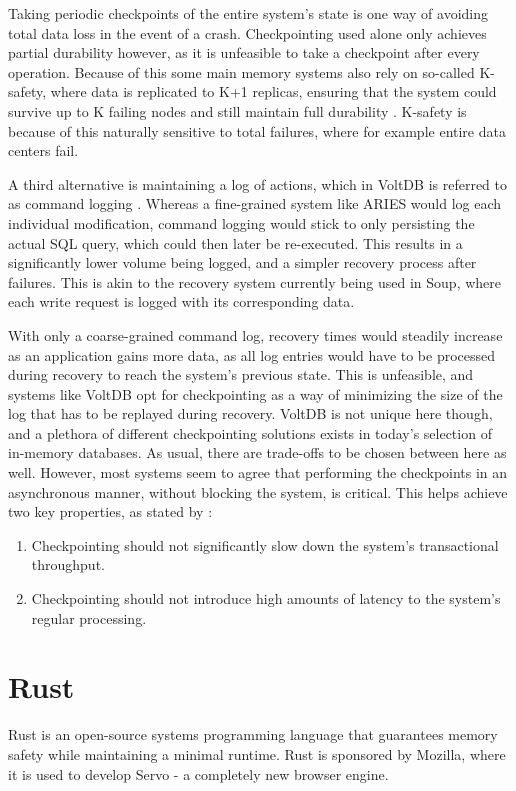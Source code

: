 \documentclass[b5paper]{report}
\begin{document}
Taking periodic checkpoints of the entire system's state is one way of avoiding
total data loss in the event of a crash. Checkpointing used alone only achieves
partial durability however, as it is unfeasible to take a checkpoint after every
operation. Because of this some main memory systems also rely on so-called
K-safety, where data is replicated to K+1 replicas, ensuring that the system
could survive up to K failing nodes and still maintain full durability
\cite{early-voltdb}. K-safety is because of this naturally sensitive to total
failures, where for example entire data centers fail.

A third alternative is maintaining a log of actions, which in VoltDB is referred
to as command logging \cite{voltdb-recovery}. Whereas a fine-grained system like
ARIES would log each individual modification, command logging would stick to
only persisting the actual SQL query, which could then later be re-executed.
This results in a significantly lower volume being logged, and a simpler
recovery process after failures. This is akin to the recovery system currently
being used in Soup, where each write request is logged with its corresponding
data.

With only a coarse-grained command log, recovery times would steadily increase
as an application gains more data, as all log entries would have to be processed
during recovery to reach the system's previous state. This is unfeasible, and
systems like VoltDB opt for checkpointing as a way of minimizing the size of the
log that has to be replayed during recovery. VoltDB is not unique here though,
and a plethora of different checkpointing solutions exists in today's selection
of in-memory databases. As usual, there are trade-offs to be chosen between here
as well. However, most systems seem to agree that performing the checkpoints in an
asynchronous manner, without blocking the system, is critical. This helps
achieve two key properties, as stated by \cite{memory-checkpoint}:

\begin{enumerate}
  \item Checkpointing should not significantly slow down the system's
    transactional throughput.
  \item Checkpointing should not introduce high amounts of latency to the
    system's regular processing.
\end{enumerate}

\section{Rust}
Rust \cite{rust} is an open-source systems programming language that guarantees memory
safety while maintaining a minimal runtime. Rust is sponsored by Mozilla, where
it is used to develop Servo - a completely new browser engine.
\end{document}
